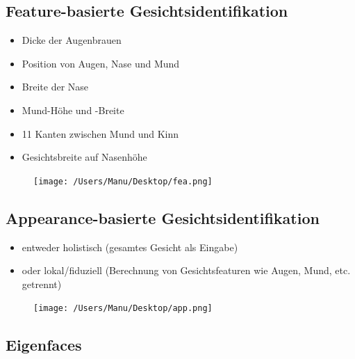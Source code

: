 \documentclass[paper=a4, fontsize=11pt]{scrartcl} %
\numberwithin{equation}{section} %
\numberwithin{figure}{section} %
\numberwithin{table}{section} %
\begin{document}
\subsection{Feature-basierte Gesichtsidentifikation}

\begin{minipage}{0.65\textwidth}
\begin{itemize}
\item Dicke der Augenbrauen
\item Position von Augen, Nase und Mund
\item Breite der Nase
\item Mund-Höhe und -Breite
\item 11 Kanten zwischen Mund und Kinn
\item Gesichtsbreite auf Nasenhöhe
\end{itemize}
\end{minipage} \hfill
\begin{minipage}{0.3\textwidth}
\begin{figure}[H]
\texttt{[image: /Users/Manu/Desktop/fea.png]}
\end{figure}
\end{minipage}

\subsection{Appearance-basierte Gesichtsidentifikation}

\begin{minipage}{0.65\textwidth}
\begin{itemize}
\item entweder holistisch (gesamtes Gesicht als Eingabe)
\item oder lokal/fiduziell (Berechnung von Gesichtsfeaturen wie Augen, Mund, etc. getrennt)
\end{itemize}
\end{minipage} \hfill
\begin{minipage}{0.3\textwidth}
\begin{figure}[H]
\texttt{[image: /Users/Manu/Desktop/app.png]}
\end{figure}
\end{minipage}

\subsection{Eigenfaces}
\end{document}

